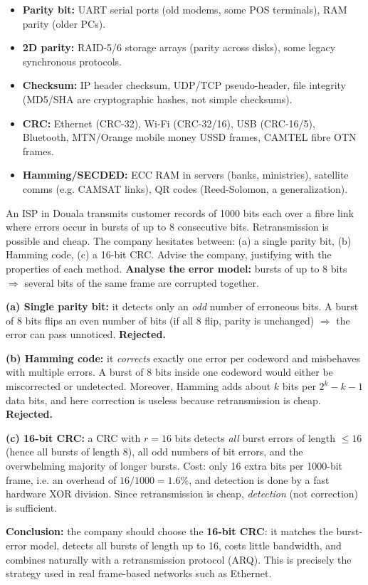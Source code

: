 \documentclass[11pt]{article}
\begin{document}
\begin{savaistu}
\begin{itemize}
\item \textbf{Parity bit:} UART serial ports (old modems, some POS terminals), RAM parity (older PCs).
\item \textbf{2D parity:} RAID-5/6 storage arrays (parity across disks), some legacy synchronous protocols.
\item \textbf{Checksum:} IP header checksum, UDP/TCP pseudo-header, file integrity (MD5/SHA are cryptographic hashes, not simple checksums).
\item \textbf{CRC:} Ethernet (CRC-32), Wi-Fi (CRC-32/16), USB (CRC-16/5), Bluetooth, MTN/Orange mobile money USSD frames, CAMTEL fibre OTN frames.
\item \textbf{Hamming/SECDED:} ECC RAM in servers (banks, ministries), satellite comms (e.g. CAMSAT links), QR codes (Reed-Solomon, a generalization).
\end{itemize}
\end{savaistu}

\begin{exoresolu}
An ISP in Douala transmits customer records of 1000 bits each over a fibre link where errors occur in bursts of up to 8 consecutive bits. Retransmission is possible and cheap. The company hesitates between: (a) a single parity bit, (b) Hamming code, (c) a 16-bit CRC. Advise the company, justifying with the properties of each method.
\tcblower
\textbf{Analyse the error model:} bursts of up to 8 bits $\Rightarrow$ several bits of the same frame are corrupted together.\par\smallskip
\textbf{(a) Single parity bit:} it detects only an \emph{odd} number of erroneous bits. A burst of 8 bits flips an even number of bits (if all 8 flip, parity is unchanged) $\Rightarrow$ the error can pass unnoticed. \textbf{Rejected.}\par\smallskip
\textbf{(b) Hamming code:} it \emph{corrects} exactly one error per codeword and misbehaves with multiple errors. A burst of 8 bits inside one codeword would either be miscorrected or undetected. Moreover, Hamming adds about $k$ bits per $2^k - k - 1$ data bits, and here correction is useless because retransmission is cheap. \textbf{Rejected.}\par\smallskip
\textbf{(c) 16-bit CRC:} a CRC with $r = 16$ bits detects \emph{all} burst errors of length $\le 16$ (hence all bursts of length 8), all odd numbers of bit errors, and the overwhelming majority of longer bursts. Cost: only 16 extra bits per 1000-bit frame, i.e. an overhead of $16/1000 = 1.6\%$, and detection is done by a fast hardware XOR division. Since retransmission is cheap, \emph{detection} (not correction) is sufficient.\par\smallskip
\textbf{Conclusion:} the company should choose the \textbf{16-bit CRC}: it matches the burst-error model, detects all bursts of length up to 16, costs little bandwidth, and combines naturally with a retransmission protocol (ARQ). This is precisely the strategy used in real frame-based networks such as Ethernet.
\end{exoresolu}
\end{document}
